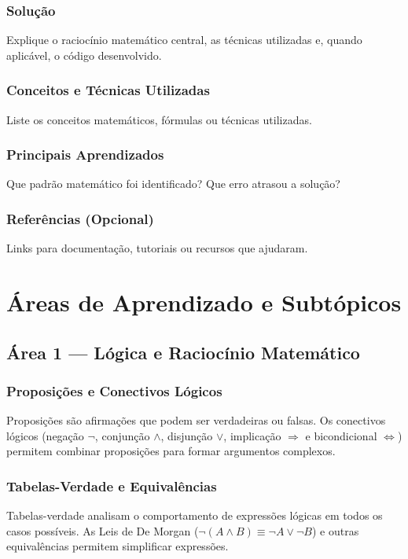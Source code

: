 \documentclass[12pt, a4paper]{article}
\begin{document}
\subsubsection*{Solução}
Explique o raciocínio matemático central, as técnicas utilizadas e, quando aplicável, o
código desenvolvido.
\vspace{3.5em}

\subsubsection*{Conceitos e Técnicas Utilizadas}
Liste os conceitos matemáticos, fórmulas ou técnicas utilizadas.
\vspace{3em}

\subsubsection*{Principais Aprendizados}
Que padrão matemático foi identificado? Que erro atrasou a solução?
\vspace{3em}

\subsubsection*{Referências (Opcional)}
Links para documentação, tutoriais ou recursos que ajudaram.

\clearpage

\section{Áreas de Aprendizado e Subtópicos}

\subsection*{Área 1 --- Lógica e Raciocínio Matemático}

\subsubsection*{Proposições e Conectivos Lógicos}
Proposições são afirmações que podem ser verdadeiras ou falsas. Os conectivos lógicos
(negação $\neg$, conjunção $\wedge$, disjunção $\vee$, implicação $\Rightarrow$ e
bicondicional $\Leftrightarrow$) permitem combinar proposições para formar argumentos
complexos.

\subsubsection*{Tabelas-Verdade e Equivalências}
Tabelas-verdade analisam o comportamento de expressões lógicas em todos os casos possíveis.
As Leis de De Morgan ($\neg(A \wedge B) \equiv \neg A \vee \neg B$) e outras equivalências
permitem simplificar expressões.
\end{document}
